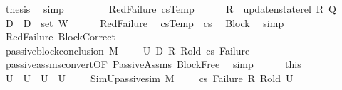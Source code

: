 \begin{isabellebody}
\ {\isacharquery}{\kern0pt}thesis\ \isamarkupfalse%
\ simp\isanewline
\ \ \isamarkupfalse%
\isanewline
\ \ \ \ \isamarkupfalse%
\ {\isacharparenleft}{\kern0pt}RedFailure\ csTemp{\isacharparenright}{\kern0pt}\isanewline
\ \ \ \ \isamarkupfalse%
\ {\isacharquery}{\kern0pt}R{\isacharprime}{\kern0pt}\ {\isacharequal}{\kern0pt}\ {\isachardoublequoteopen}update{\isacharunderscore}{\kern0pt}nstate{\isacharunderscore}{\kern0pt}rel\ R\ Q{\isachardoublequoteclose}\isanewline
\ \ \ \ \isamarkupfalse%
\ {\isacharquery}{\kern0pt}D{}\ {\isacharequal}{\kern0pt}\ {\isachardoublequoteopen}D{}\ {\isasymunion}\ {\isacharparenleft}{\kern0pt}set\ W{\isacharparenright}{\kern0pt}{\isachardoublequoteclose}\isanewline
\ \ \ \ \isamarkupfalse%
\ RedFailure\ \isamarkupfalse%
\ {\isachardoublequoteopen}csTemp\ {\isacharequal}{\kern0pt}\ cs{\isachardoublequoteclose}\ \isamarkupfalse%
\ Block\ \isamarkupfalse%
\ simp\isanewline
\ \ \ \ \isamarkupfalse%
\ RedFailure\ BlockCorrect\ \isamarkupfalse%
\ {\isachardoublequoteopen}passive{\isacharunderscore}{\kern0pt}block{\isacharunderscore}{\kern0pt}conclusion\ M\ {\isasymLambda}{}\ {\isasymLambda}{}\ {\isasymGamma}\ {\isasymOmega}\ U{}\ {\isacharquery}{\kern0pt}D{}\ {\isacharquery}{\kern0pt}R{\isacharprime}{\kern0pt}\ R{\isacharunderscore}{\kern0pt}old\ cs{}\ Failure{\isachardoublequoteclose}\isanewline
\ \ \ \ \ \ \isamarkupfalse%
\ passive{\isacharunderscore}{\kern0pt}assms{\isacharunderscore}{\kern0pt}convert{\isacharbrackleft}{\kern0pt}OF\ PassiveAssms\ BlockFree{\isacharbrackright}{\kern0pt}\ \isamarkupfalse%
\ simp\isanewline
\ \ \ \ \isamarkupfalse%
\ this\ \isamarkupfalse%
\ U{}\ \ {\isachardoublequoteopen}U{}\ {\isasymsubseteq}\ U{}{\isachardoublequoteclose}\ \ {\isachardoublequoteopen}U{}\ {\isasymnoteq}\ {\isacharbraceleft}{\kern0pt}{\isacharbraceright}{\kern0pt}{\isachardoublequoteclose}\ \ \ SimU{}{\isacharcolon}{\kern0pt}{\isachardoublequoteopen}passive{\isacharunderscore}{\kern0pt}sim\ M\ {\isasymLambda}{}\ {\isasymLambda}{}\ {\isasymGamma}\ {\isasymOmega}\ cs{}\ Failure\ {\isacharquery}{\kern0pt}R{\isacharprime}{\kern0pt}\ R{\isacharunderscore}{\kern0pt}old\ U{}{\isachardoublequoteclose}\isanewline

\end{isabellebody}
